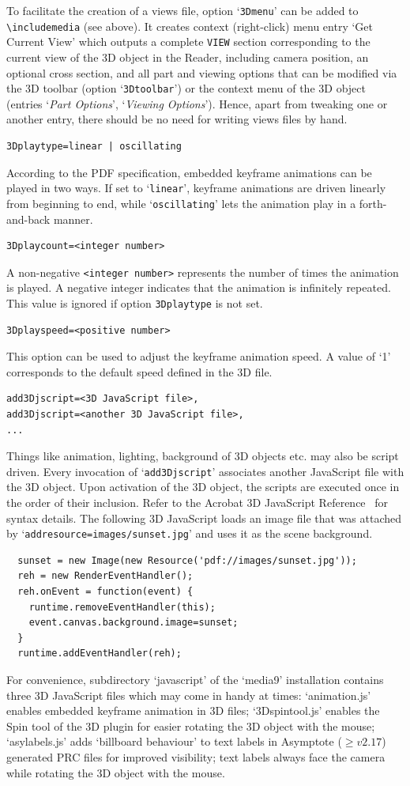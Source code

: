 \documentclass[a4paper]{article}
\begin{document}
To facilitate the creation of a views file, option `\verb+3Dmenu+' can be added to \verb+\includemedia+ (see above). It creates context (right-click) menu entry `Get Current View' which outputs a complete \verb+VIEW+ section corresponding to the current view of the 3D object in the Reader, including camera position, an optional cross section, and all part and viewing options that can be modified via the 3D toolbar (option `\verb+3Dtoolbar+') or the context menu of the 3D object (entries `\emph{\sffamily Part Options}', `\emph{\sffamily Viewing Options}'). Hence, apart from tweaking one or another entry, there should be no need for writing views files by hand.
\begin{verbatim}
3Dplaytype=linear | oscillating
\end{verbatim}
According to the PDF specification, embedded keyframe animations can be played in two ways. If set to `\verb+linear+', keyframe animations are driven linearly from beginning to end, while `\verb+oscillating+' lets the animation play in a forth-and-back manner.
\begin{verbatim}
3Dplaycount=<integer number>
\end{verbatim}
A non-negative \verb+<integer number>+ represents the number of times the animation is played. A negative integer indicates that the animation is infinitely repeated. This value is ignored if option \verb+3Dplaytype+ is not set.
\begin{verbatim}
3Dplayspeed=<positive number>
\end{verbatim}
This option can be used to adjust the keyframe animation speed. A value of `1' corresponds to the default speed defined in the 3D file.
\hypertarget{add3Djscript}{}%
\begin{verbatim}
add3Djscript=<3D JavaScript file>,
add3Djscript=<another 3D JavaScript file>,
...
\end{verbatim}
Things like animation, lighting, background of 3D objects etc. may also be script driven. Every invocation of `\verb+add3Djscript+' associates another JavaScript file with the 3D object. Upon activation of the 3D object, the scripts are executed once in the order of their inclusion. Refer to the Acrobat 3D JavaScript Reference~\cite{jscript3D} for syntax details. The following 3D JavaScript loads an image file that was attached by `\verb+addresource=images/sunset.jpg+' and uses it as the scene background.
\begin{verbatim}
  sunset = new Image(new Resource('pdf://images/sunset.jpg'));
  reh = new RenderEventHandler();
  reh.onEvent = function(event) {
    runtime.removeEventHandler(this);
    event.canvas.background.image=sunset;
  }
  runtime.addEventHandler(reh);
\end{verbatim}
\hypertarget{3dscripts}{}For convenience, subdirectory `javascript' of the `media9' installation contains three 3D JavaScript files which may come in handy at times: `animation.js' enables embedded keyframe animation in 3D files; `3Dspintool.js' enables the Spin tool of the 3D plugin for easier rotating the 3D object with the mouse; `asylabels.js' adds `billboard behaviour' to text labels in Asymptote ($\ge v2.17$) generated PRC files for improved visibility; text labels always face the camera while rotating the 3D object with the mouse.
\end{document}
